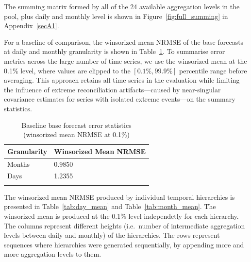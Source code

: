 \documentclass[sn-basic,Numbered,iicol]{sn-jnl}
\theoremstyle{thmstyleone}%
\theoremstyle{thmstyletwo}%
\theoremstyle{thmstylethree}%
\begin{document}
The summing matrix formed by all of the 24 available aggregation levels in the pool, plus daily and monthly level is shown in Figure~\ref{fig:full_summing} in Appendix~\ref{secA1}.

For a baseline of comparison, the winsorized mean NRMSE of the base forecasts at daily and monthly granularity is shown in Table~\ref{tab:baseline}. To summarise error metrics across the large number of time series, we use the winsorized mean at the 0.1\% level, where values are clipped to the $[0.1\%, 99.9\%]$ percentile range before averaging. This approach retains all time series in the evaluation while limiting the influence of extreme reconciliation artifacts---caused by near-singular covariance estimates for series with isolated extreme events---on the summary statistics.

\begin{table}[h]
\caption{Baseline base forecast error statistics (winsorized mean NRMSE at 0.1\%)}\label{tab:baseline}
\begin{tabular}{@{}ll@{}}
\toprule
Granularity & Winsorized Mean NRMSE \\
\midrule
Months & 0.9850 \\
Days & 1.2355 \\
\botrule
\end{tabular}
\end{table}

The winsorized mean NRMSE produced by individual temporal hierarchies is presented in Table~\ref{tab:day_mean} and Table~\ref{tab:month_mean}. The winsorized mean is produced at the 0.1\% level independetly for each hierarchy. The columns represent different heights (i.e.\ number of intermediate aggregation levels between daily and monthly) of the hierarchies. The rows represent sequences where hierarchies were generated sequentially, by appending more and more aggregation levels to them.
\end{document}

